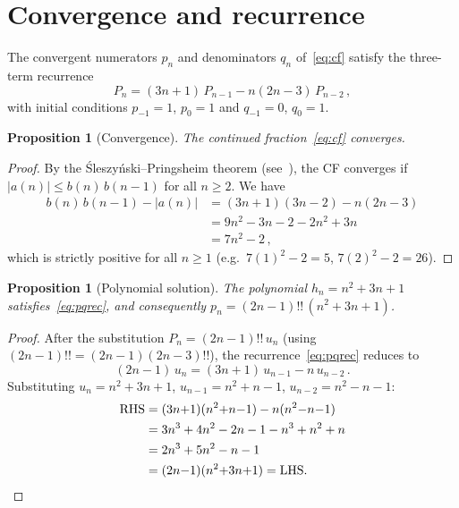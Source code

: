\documentclass[11pt]{article}
\newcommand{\dff}[1]{(#1)!!}
\newtheorem{proposition}[theorem]{Proposition}
\theoremstyle{remark}
\begin{document}
\section{Convergence and recurrence}\label{sec:rec}

The convergent numerators $p_n$ and denominators $q_n$ of~\eqref{eq:cf}
satisfy the three-term recurrence
\begin{equation}\label{eq:pqrec}
  P_n = (3n{+}1)\,P_{n-1} - n(2n{-}3)\,P_{n-2}\,,
\end{equation}
with initial conditions $p_{-1}=1$, $p_0=1$ and $q_{-1}=0$, $q_0=1$.

\begin{proposition}[Convergence]\label{prop:conv}
The continued fraction~\eqref{eq:cf} converges.
\end{proposition}

\begin{proof}
By the \'Sleszy\'nski--Pringsheim theorem
(see~\cite[Ch.~III]{wall1948analytic}), the CF converges if
$|a(n)| \leq b(n)\,b(n{-}1)$ for all $n \geq 2$.  We have
\begin{align*}
  b(n)\,b(n{-}1) - |a(n)|
  &= (3n{+}1)(3n{-}2) - n(2n{-}3) \\
  &= 9n^2 - 3n - 2 - 2n^2 + 3n \\
  &= 7n^2 - 2\,,
\end{align*}
which is strictly positive for all $n \geq 1$
(e.g.\ $7(1)^2 - 2 = 5$, $7(2)^2 - 2 = 26$).
\end{proof}

\begin{proposition}[Polynomial solution]\label{prop:poly}
The polynomial $h_n = n^2+3n+1$ satisfies~\eqref{eq:pqrec},
and consequently $p_n = \dff{2n{-}1}\,(n^2+3n+1)$.
\end{proposition}

\begin{proof}
After the substitution $P_n = \dff{2n{-}1}\,u_n$
(using $\dff{2n{-}1} = (2n{-}1)\dff{2n{-}3}$),
the recurrence~\eqref{eq:pqrec} reduces to
\begin{equation}\label{eq:rec}
  (2n{-}1)\,u_n = (3n{+}1)\,u_{n-1} - n\,u_{n-2}\,.
\end{equation}
Substituting $u_n = n^2+3n+1$, $u_{n-1} = n^2+n-1$, $u_{n-2} = n^2-n-1$:
\begin{align*}
  \text{RHS} &= (3n{+}1)(n^2{+}n{-}1) - n(n^2{-}n{-}1) \\
  &= 3n^3 + 4n^2 - 2n - 1 - n^3 + n^2 + n \\
  &= 2n^3 + 5n^2 - n - 1 \\
  &= (2n{-}1)(n^2{+}3n{+}1) = \text{LHS.}\qedhere
\end{align*}
\end{proof}
\end{document}
